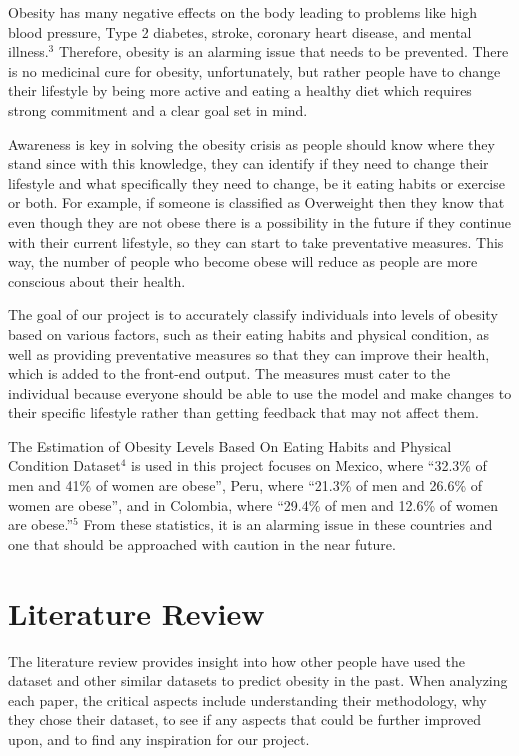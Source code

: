 \documentclass[11pt]{article}
\begin{document}
	Obesity has many negative effects on the body leading to problems like high blood pressure, Type 2 diabetes, stroke, coronary heart disease, and mental illness.$^{3}$ Therefore, obesity is an alarming issue that needs to be prevented. There is no medicinal cure for obesity, unfortunately, but rather people have to change their lifestyle by being more active and eating a healthy diet which requires strong commitment and a clear goal set in mind. 

 Awareness is key in solving the obesity crisis as people should know where they stand since with this knowledge, they can identify if they need to change their lifestyle and what specifically they need to change, be it eating habits or exercise or both. For example, if someone is classified as Overweight then they know that even though they are not obese there is a possibility in the future if they continue with their current lifestyle, so they can start to take preventative measures. This way, the number of people who become obese will reduce as people are more conscious about their health. 

The goal of our project is to accurately classify individuals into levels of obesity based on various factors, such as their eating habits and physical condition, as well as providing preventative measures so that they can improve their health, which is added to the front-end output. The measures must cater to the individual because everyone should be able to use the model and make changes to their specific lifestyle rather than getting feedback that may not affect them. 

The Estimation of Obesity Levels Based On Eating Habits and Physical Condition Dataset$^{4}$ is used in this project focuses on Mexico, where “32.3\% of men and 41\% of women are obese”, Peru, where “21.3\% of men and 26.6\% of women are obese”, and in Colombia, where “29.4\% of men and 12.6\% of women are obese.”$^{5}$ From these statistics, it is an alarming issue in these countries and one that should be approached with caution in the near future. 

\section{Literature Review}
The literature review provides insight into how other people have used the dataset and other similar datasets to predict obesity in the past. When analyzing each paper, the critical aspects include understanding their methodology, why they chose their dataset, to see if any aspects that could be further improved upon, and to find any inspiration for our project. 
\end{document}
